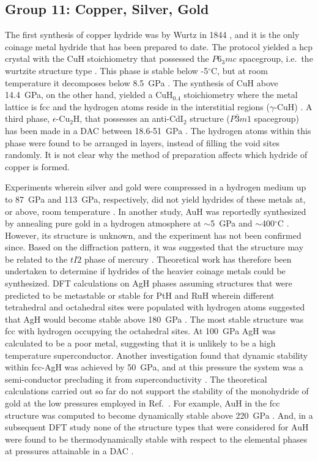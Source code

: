 \documentclass[12pt,letterpaper,oneside]{article}
\begin{document}
\subsection{Group 11: Copper, Silver, Gold} 

The first synthesis of copper hydride was by Wurtz in 1844 \cite{Wurtz:1844}, and it is the only coinage metal hydride that has been prepared to date. The protocol yielded a hcp crystal with the CuH stoichiometry that possessed the $P6_3mc$ spacegroup, i.e.\ the wurtzite structure type \cite{Muller:1926,Goedkoop:1955}. This phase is stable below -5$^\circ$C, but at room temperature it decomposes below 8.5~GPa \cite{Tkacz:2004}. 
The synthesis of CuH  above 14.4~GPa, on the other hand, yielded a CuH$_{0.4}$ stoichiometry where the metal lattice is fcc and the hydrogen atoms reside in the interstitial regions ($\gamma$-CuH) \cite{Burtovyy:2004}. A third phase, $\epsilon$-Cu$_2$H, that possesses an anti-CdI$_2$ structure ($P\bar{3}m1$ spacegroup) has been made in a DAC between 18.6-51~GPa  \cite{Donnerer:2013}. The hydrogen atoms within this phase were found to be arranged in layers, instead of filling the void sites randomly. It is not clear why the method of preparation affects which hydride of copper is formed. 


Experiments wherein silver and gold were compressed in a hydrogen medium up to 87~GPa and 113~GPa, respectively, did not yield hydrides of these metals at, or above, room temperature \cite{Donnerer:2013}. In another study, AuH was reportedly synthesized by annealing pure gold in a hydrogen atmosphere at $\sim$5~GPa and $\sim$400$^\circ$C \cite{Antonov:1982}. However, its structure is unknown, and the experiment has not been confirmed since. Based on the diffraction pattern, it was suggested that the structure may be related to the $tI2$ phase of mercury \cite{Degtyareva:2015}. Theoretical work has therefore been undertaken to determine if hydrides of the heavier coinage metals could be synthesized. DFT calculations on AgH phases assuming structures that were predicted to be metastable or stable for PtH and RuH wherein different tetrahedral and octahedral sites were populated with hydrogen atoms suggested that AgH would become stable above 180~GPa \cite{Gao:2012}. The most stable structure was fcc with hydrogen occupying the octahedral sites. At 100~GPa AgH was calculated to be a poor metal, suggesting that it is unlikely to be a high temperature superconductor. Another investigation found that dynamic stability within fcc-AgH was achieved by 50~GPa, and at this pressure the system was a semi-conductor precluding it from superconductivity \cite{Kim:2011a}. The theoretical calculations carried out so far do not support the stability of the monohydride of gold at the low pressures employed in Ref.\ \cite{Antonov:1982}. For example, AuH in the fcc structure was computed to become dynamically stable above 220~GPa \cite{Kim:2011a}. And, in a subsequent DFT study none of the structure types that were considered for AuH were found to be thermodynamically stable with respect to the elemental phases at pressures attainable in a DAC \cite{Gao:2012}.
\end{document}
